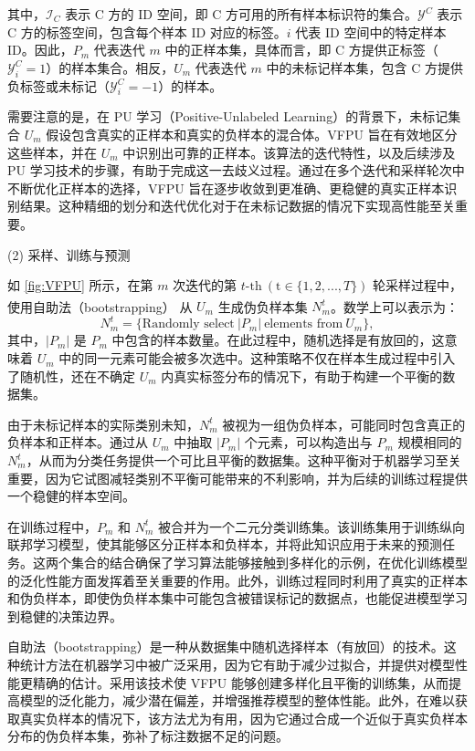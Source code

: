 其中，${{\mathsf{\mathcal{I}}}_{C}}$ 表示 C 方的 ID 空间，即 C 方可用的所有样本标识符的集合。${{\mathsf{\mathcal{Y}}}^{C}}$ 表示 C 方的标签空间，包含每个样本 ID 对应的标签。$i$ 代表 ID 空间中的特定样本 ID。因此，${{P}_{m}}$ 代表迭代 $m$ 中的正样本集，具体而言，即 C 方提供正标签（$\mathsf{\mathcal{Y}}_{i}^{C}=1$）的样本集合。相反，${{U}_{m}}$ 代表迭代 $m$ 中的未标记样本集，包含 C 方提供负标签或未标记（$\mathsf{\mathcal{Y}}_{i}^{C}=-1$）的样本。

需要注意的是，在 PU 学习（Positive-Unlabeled Learning）的背景下，未标记集合 ${{U}_{m}}$ 假设包含真实的正样本和真实的负样本的混合体。VFPU 旨在有效地区分这些样本，并在 ${{U}_{m}}$ 中识别出可靠的正样本。该算法的迭代特性，以及后续涉及 PU 学习技术的步骤，有助于完成这一去歧义过程。通过在多个迭代和采样轮次中不断优化正样本的选择，VFPU 旨在逐步收敛到更准确、更稳健的真实正样本识别结果。这种精细的划分和迭代优化对于在未标记数据的情况下实现高性能至关重要。

(2) 采样、训练与预测

如 \ref{fig:VFPU} 所示，在第 $m$ 次迭代的第 $t\text{-th} \ (\text{t}\in \{1,2,...,T\})$ 轮采样过程中，使用自助法（bootstrapping）\textsuperscript{\cite{mordelet2014bagging}} 从 $U_{m}$ 生成伪负样本集 $N_{m}^{t}$。数学上可以表示为：
\begin{equation}
	N_{m}^{t}=\{ \text{Randomly select} \ |P_{m}| \ \text{elements from} \ U_{m} \},
\end{equation}
其中，$|P_{m}|$ 是 $P_{m}$ 中包含的样本数量。在此过程中，随机选择是有放回的，这意味着 $U_{m}$ 中的同一元素可能会被多次选中。这种策略不仅在样本生成过程中引入了随机性，还在不确定 $U_{m}$ 内真实标签分布的情况下，有助于构建一个平衡的数据集。

由于未标记样本的实际类别未知，$N_{m}^{t}$ 被视为一组伪负样本，可能同时包含真正的负样本和正样本。通过从 $U_{m}$ 中抽取 $|P_{m}|$ 个元素，可以构造出与 $P_{m}$ 规模相同的 $N_{m}^{t}$，从而为分类任务提供一个可比且平衡的数据集。这种平衡对于机器学习至关重要，因为它试图减轻类别不平衡可能带来的不利影响，并为后续的训练过程提供一个稳健的样本空间。

在训练过程中，$P_{m}$ 和 $N_{m}^{t}$ 被合并为一个二元分类训练集。该训练集用于训练纵向联邦学习模型，使其能够区分正样本和负样本，并将此知识应用于未来的预测任务。这两个集合的结合确保了学习算法能够接触到多样化的示例，在优化训练模型的泛化性能方面发挥着至关重要的作用。此外，训练过程同时利用了真实的正样本和伪负样本，即使伪负样本集中可能包含被错误标记的数据点，也能促进模型学习到稳健的决策边界。

自助法（bootstrapping）是一种从数据集中随机选择样本（有放回）的技术。这种统计方法在机器学习中被广泛采用，因为它有助于减少过拟合，并提供对模型性能更精确的估计。采用该技术使 VFPU 能够创建多样化且平衡的训练集，从而提高模型的泛化能力，减少潜在偏差，并增强推荐模型的整体性能。此外，在难以获取真实负样本的情况下，该方法尤为有用，因为它通过合成一个近似于真实负样本分布的伪负样本集，弥补了标注数据不足的问题。


